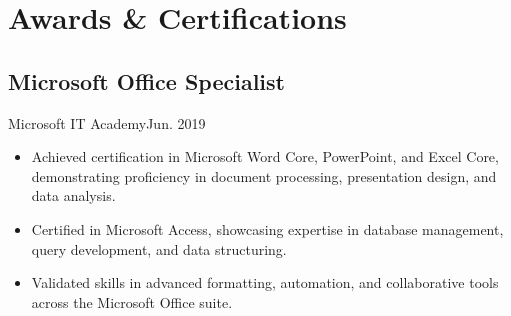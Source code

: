 \section{Awards \& Certifications}
\subsection{Microsoft Office Specialist}{Microsoft IT Academy}{Jun. 2019}
\begin{itemize}
    \item Achieved certification in Microsoft Word Core, PowerPoint, and Excel Core, demonstrating proficiency in document processing, presentation design, and data analysis.  
    \item Certified in Microsoft Access, showcasing expertise in database management, query development, and data structuring.  
    \item Validated skills in advanced formatting, automation, and collaborative tools across the Microsoft Office suite.  
\end{itemize}
